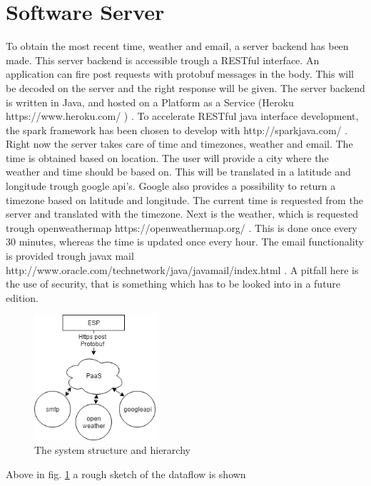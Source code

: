 \section{Software Server}
To obtain the most recent time, weather and email, a server backend has been made. This server backend is accessible trough a RESTful interface. An application can fire post requests with protobuf messages in the body. This will be decoded on the server and the right response will be given. The server backend is written in Java, and hosted on a Platform as a Service (Heroku https://www.heroku.com/ ) . To accelerate RESTful java interface development, the spark framework has been chosen to develop with http://sparkjava.com/ . Right now the server takes care of time and timezones, weather and email. The time is obtained based on location. The user will provide a city where the weather and time should be based on. This will be translated in a latitude and longitude trough google api's. Google also provides a possibility to return a timezone based on latitude and longitude. The current time is requested from the server and translated with the timezone. Next is the weather, which is requested trough openweathermap https://openweathermap.org/ . This is done once every 30 minutes, whereas the time is updated once every hour. The email functionality is provided trough javax mail http://www.oracle.com/technetwork/java/javamail/index.html . A pitfall here is the use of security, that is something which has to be looked into in a future edition.
\begin{figure}[H]
	\centering
	\label{fig:block_server}
	\includegraphics[width=0.4\textwidth]{fig/block_server.png}
	\caption{The system structure and hierarchy}
\end{figure}
Above in fig. \ref{fig:block_server} a rough sketch of the dataflow is shown
